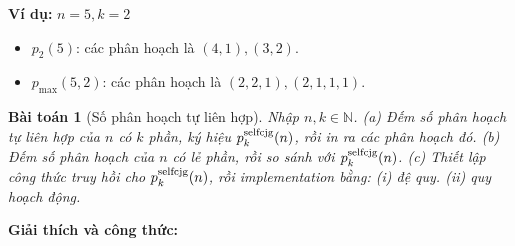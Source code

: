 \documentclass{article}
\newtheorem{baitoan}{Bài toán}
\begin{document}
\textbf{Ví dụ:} $n=5, k=2$
\begin{itemize}
    \item $p_2(5)$: các phân hoạch là $(4,1), (3,2)$.
    \item $p_{\max}(5,2)$: các phân hoạch là $(2,2,1), (2,1,1,1)$.
\end{itemize}


\begin{baitoan}[Số phân hoạch tự liên hợp]
    Nhập $n,k\in\mathbb{N}$. (a) Đếm số phân hoạch tự liên hợp của $n$ có $k$ phần, ký hiệu $p_k^{\rm selfcjg}(n)$, rồi in ra các phân hoạch đó. (b) Đếm số phân hoạch của $n$ có lẻ phần, rồi so sánh với $p_k^{\rm selfcjg}(n)$. (c) Thiết lập công thức truy hồi cho $p_k^{\rm selfcjg}(n)$, rồi implementation bằng: (i) đệ quy. (ii) quy hoạch động.
\end{baitoan}


\textbf{Giải thích và công thức:}
\end{document}
